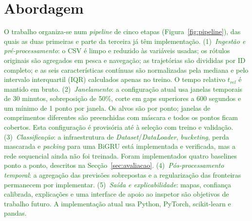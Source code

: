 \documentclass{article}
\begin{document}
\section{Abordagem}
\label{sec:abordagem}

\textcolor{green}{O trabalho organiza-se num \emph{pipeline} de cinco etapas (Figura~\ref{fig:pipeline}), das quais as duas primeiras e parte da terceira já têm implementação. (1)~\emph{Ingestão e pré-processamento}: o CSV é limpo e reduzido às variáveis usadas; os rótulos originais são agregados em pesca e navegação; as trajetórias são divididas por ID completo; e as seis características contínuas são normalizadas pela mediana e pelo intervalo interquartil (IQR) calculados apenas no treino. O tempo relativo $t_{rel}$ é mantido em bruto. (2)~\emph{Janelamento}: a configuração atual usa janelas temporais de 30 minutos, sobreposição de 50\%, corte em gaps superiores a 600 segundos e um mínimo de 1 ponto por janela. Os alvos são por ponto; janelas de comprimentos diferentes são preenchidas com máscara e todos os pontos ficam cobertos. Esta configuração é provisória até à seleção com treino e validação. (3)~\emph{Classificação}: a infraestrutura de \emph{Dataset}/\emph{DataLoader}, \emph{bucketing}, perda mascarada e \emph{packing} para uma BiGRU está implementada e verificada, mas a rede sequencial ainda não foi treinada. Foram implementados quatro baselines ponto a ponto, descritos na Secção~\ref{sec:avaliacao}. (4)~\emph{Pós-processamento temporal}: a agregação das previsões sobrepostas e a regularização das fronteiras permanecem por implementar. (5)~\emph{Saída e explicabilidade}: mapas, confiança calibrada, explicações e uma interface de apoio ao inspetor são objetivos de trabalho futuro. A implementação atual usa Python, PyTorch, scikit-learn e pandas.}

\begin{center}
\label{fig:pipeline}
\end{center}
\end{document}
